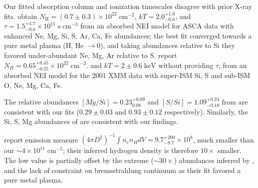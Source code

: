\documentclass[preprint2,tighten,trackchanges]{aastex6}
\newcommand*{\mt}{\mathrm}
\newcommand*{\unit}[1]{\;\mt{#1}}  %
\newcommand*{\abt}{\mathord{\sim}} %
\newcommand*{\nH}{N_{\mathrm{H}}}
\newcommand*{\nHUnits}{\times 10^{22} \unit{cm^{-2}}}
\newcommand*{\kB}{k}  %
\begin{document}


Our fitted absorption column and ionization timescales disagree with prior
X-ray fits.
\citet{rakowski2001} obtain $\nH = (0.7 \pm 0.3) \nHUnits$,
$\kB T = 2.0^{+1.0}_{-0.6}$, and
$\tau = 1.5^{+4.7}_{-0.6} \times 10^{11} \unit{s\;cm^{-3}}$
from an absorbed NEI model for ASCA data with enhanced Ne, Mg, Si, S, Ar, Ca,
Fe abundances; the best fit converged towards a pure metal plasma
(H, He $\to 0$), and taking abundances relative to Si they favored
under-abundant Ne, Mg, Ar relative to S.
\citet{safi-harb2007} report $N_H = 0.65^{+0.45}_{-0.25} \nHUnits$.
and $\kB T = 2 \pm 0.6 \unit{keV}$ without providing $\tau$, from
an absorbed NEI model for the 2001 XMM data with
super-ISM Si, S and sub-ISM O, Ne, Mg, Ca, Fe.

The relative abundances $[Mg/Si] = 0.23^{+0.09}_{0.08}$ and $[S/Si] =
1.09^{+0.24}_{-0.18}$ from \citet{rakowski2001} are consistent with our fits
($0.29 \pm 0.03$ and $0.93 \pm 0.12$ respectively).  Similarly, the Si, S, Mg
abundances of \citet{safi-harb2007} are consistent with our
findings.

\citet{rakowski2001} report emission measure
$(4\pi D^2)^{-1} \int n_e n_H dV = 9.7^{+200}_{-9.7} \times 10^8$, much smaller
than our $\abt 4 \times 10^{11} \unit{cm^{-5}}$; their inferred hydrogen
density is therefore $10\times$ smaller.
The low value is partially offset by the extreme ($\abt 30\times$) abundances
inferred by \citet{rakowski2001}, and the lack of constraint on bremsstrahlung
continuum as their fit favored a pure metal plasma.
\end{document}
